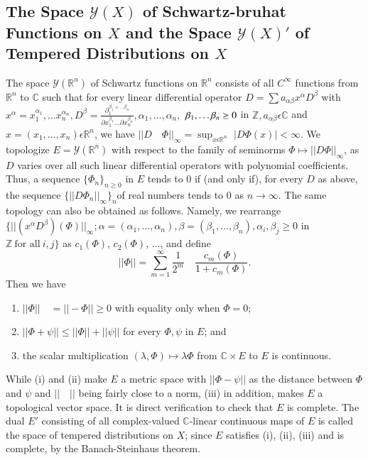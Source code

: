 \subsection{The Space $\mathscr{Y}(X)$ of Schwartz-bruhat Functions
  on $X$ and the Space $\mathscr{Y}(X)'$ of Tempered Distributions on
  $X$}\label{chap2:sec1:subsec2} %

The space $\mathscr{Y}(\mathbb{R}^{n})$ of Schwartz functions on
$\mathbb{R}^{n}$ consists of all $C^{\infty}$ functions from
$\mathbb{R}^{n}$ to $\mathbb{C}$ such that for every linear
differential operator $D=\sum a_{\alpha\beta}x^{\alpha}D^{\beta}$ with
$x^{\alpha}=x_{1}^{\alpha_{1}},\ldots x_{n}^{\alpha_{n}},
D^{\beta}=\frac{\partial_{1}^{\beta_{1}+\ldots\beta_{n}}}{\partial
  x_{1}^{\beta_{1}}\ldots\partial
  x_{n}^{\beta_{n}}},\alpha_1,\ldots,\alpha_{n},$
$\beta_{1},\ldots\break\beta_{n}\ge 0$ in $\mathbb{Z}, a_{\alpha
  \beta}\epsilon \mathbb{C}$ and $x=(x_{1},\ldots,x_{n})\epsilon
\mathbb{R}^{n}$, we have
$||D\quad\Phi||_{\infty}={\displaystyle{\mathop{\sup}_{x\epsilon
      \mathbb{R}^{n}}}}$\break 
 $|D\Phi(x)|<\infty$. We topologize $E=\mathscr{Y}(\mathbb{R}^{n})$ with
respect to the family of seminorms $\Phi\mapsto||D\Phi||_{\infty}$, as
$D$ varies over all such linear differential operators with polynomial
coefficients. Thus, a sequence $\{\Phi_{n}\}_{n\ge0}$ in $E$ tends to
$0$ if (and only if), for every $D$ as above, the sequence
$\{||D\Phi_{n}||_{\infty}\}_{n}$\pageoriginale of real numbers tends to $0$ as
$n\rightarrow \infty$. The same topology can also be obtained as
follows. Namely, we rearrange
$\{||(x^{\alpha}D^{\beta})(\Phi)||_{\infty};
\alpha=(\alpha_{1},\ldots,\alpha_{n}),
\beta=(\beta_{1},\ldots,\beta_{n}),\alpha_{i},\beta_{j}\ge 0$ in
$\mathbb{Z} ~\text{for all}~ i, j\}$ as $c_{1}(\Phi)$, $c_{2}(\Phi)$,
$\dots$, and define
\begin{equation*}
  ||\Phi||=\sum\limits_{m=1}^{\infty}\frac{1}{2^{m}}\quad
  \frac{c_{m}(\Phi)}{1+c_{m}(\Phi)}. 
\end{equation*}
Then we have
\begin{enumerate}
\renewcommand{\theenumi}{\roman{enumi}}
\renewcommand{\labelenumi}{(\theenumi)}
\item $||\Phi||\quad =||-\Phi||\ge 0$ with equality only when $\Phi=0$;
\item $||\Phi+ \psi||\le ||\Phi||+||\psi||$ for every $\Phi, \psi$ in $E$; and 
\item the scalar multiplication $(\lambda,\Phi)\mapsto\lambda\Phi$
  from $\mathbb{C}\times E$ to $E$ is continuous. 
\end{enumerate}
  While (i) and (ii) make $E$ a metric space with $||\Phi -\psi||$ as
  the distance between  $\Phi$ and $\psi$ and $||\quad||$ being fairly
  close to a norm, (iii) in addition, makes $E$ a topological vector
  space. It is direct verification to check that $E$ is complete. The
  dual $E'$ consisting of all complex-valued $\mathbb{C}$-linear
  continuous maps of $E$ is called the space of tempered distributions
  on $X$; since $E$ satisfies   (i), (ii), (iii) and is complete, by
  the Banach-Steinhaus theorem. 

